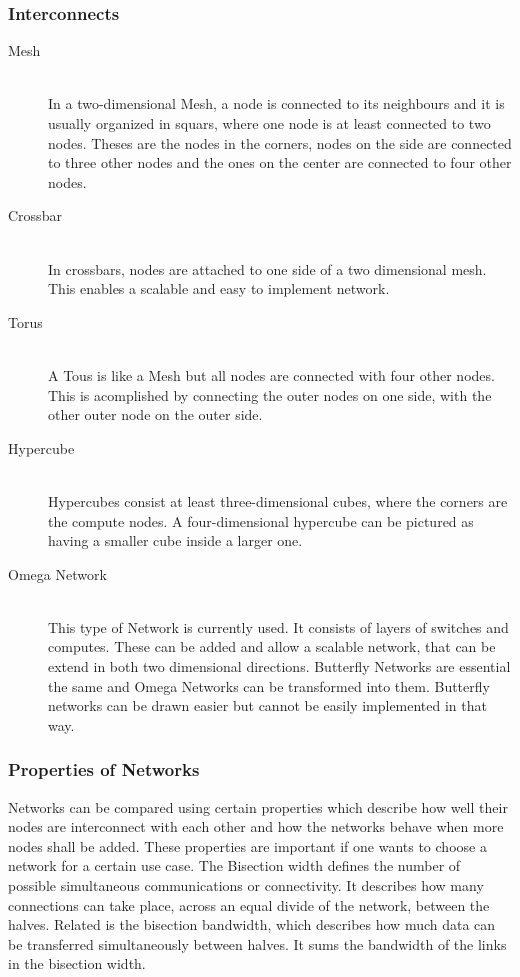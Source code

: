 \documentclass{article}
\begin{document}
\subsubsection{Interconnects} %
\label{ssub:interconnects}
	\begin{description}
			\item[Mesh] \hfill \\
			In a two-dimensional Mesh, a node is connected to its neighbours
			and it is usually organized in squars,
			where one node is at least connected to two nodes.
			Theses are the nodes in the corners,
			nodes on the side are connected to three other nodes
			and the ones on the center are connected to four other nodes.
		\item[Crossbar] \hfill \\
			In crossbars, nodes are attached to one side of a two dimensional mesh.
			This enables a scalable and easy to implement network.
		\item[Torus] \hfill \\
			A Tous is like a Mesh but all nodes are connected with four other nodes.
			This is acomplished by connecting the outer nodes on one side,
			with the other outer node on the outer side.
		\item[Hypercube] \hfill \\
			Hypercubes consist at least three-dimensional cubes,
			where the corners are the compute nodes.
			A four-dimensional hypercube can be pictured as having a smaller cube inside a larger one.
		\item[Omega Network] \hfill \\
			This type of Network is currently used.
			It consists of layers of switches and computes.
			These can be added and allow a scalable network,
			that can be extend in both two dimensional directions.
			Butterfly Networks are essential the same
			and Omega Networks can be transformed into them.
			Butterfly networks can be drawn easier but cannot be easily implemented in that way.
	\end{description}

\subsubsection{Properties of Networks} %
\label{ssub:properties_of_networks}
	Networks can be compared using certain properties
	which describe how well their nodes are interconnect with each other 
	and how the networks behave when more nodes shall be added.
	These properties are important if one wants to choose a network for a certain use case.
	The Bisection width defines the number of possible simultaneous communications or connectivity.
	It describes how many connections can take place,
	across an equal divide of the network, between the halves.
	Related is the bisection bandwidth,
	which describes how much data can be transferred simultaneously between halves.
	It sums the bandwidth of the links in the bisection width.
\end{document}
